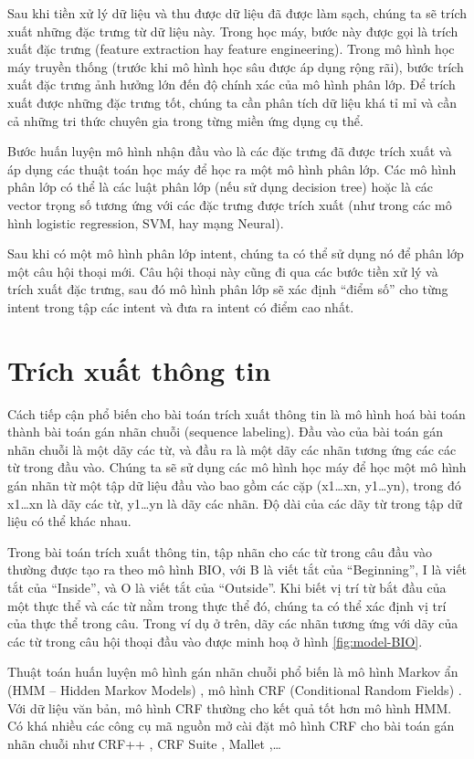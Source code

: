 Sau khi tiền xử lý dữ liệu và thu được dữ liệu đã được làm sạch, chúng ta sẽ trích xuất những đặc trưng từ dữ liệu này. Trong học máy, bước này được gọi là trích xuất đặc trưng (feature extraction hay feature engineering). Trong mô hình học máy truyền thống (trước khi mô hình học sâu được áp dụng rộng rãi), bước trích xuất đặc trưng ảnh hưởng lớn đến độ chính xác của mô hình phân lớp. Để trích xuất được những đặc trưng tốt, chúng ta cần phân tích dữ liệu khá tỉ mỉ và cần cả những tri thức chuyên gia trong từng miền ứng dụng cụ thể.

Bước huấn luyện mô hình nhận đầu vào là các đặc trưng đã được trích xuất và áp dụng các thuật toán học máy để học ra một mô hình phân lớp. Các mô hình phân lớp có thể là các luật phân lớp (nếu sử dụng decision tree) hoặc là các vector trọng số tương ứng với các đặc trưng được trích xuất (như trong các mô hình logistic regression, SVM, hay mạng Neural).

Sau khi có một mô hình phân lớp intent, chúng ta có thể sử dụng nó để phân lớp một câu hội thoại mới. Câu hội thoại này cũng đi qua các bước tiền xử lý và trích xuất đặc trưng, sau đó mô hình phân lớp sẽ xác định “điểm số” cho từng intent trong tập các intent và đưa ra intent có điểm cao nhất.

\section{Trích xuất thông tin}

Cách tiếp cận phổ biến cho bài toán trích xuất thông tin là mô hình hoá bài toán thành bài toán gán nhãn chuỗi (sequence labeling). Đầu vào của bài toán gán nhãn chuỗi là một dãy các từ, và đầu ra là một dãy các nhãn tương ứng các các từ trong đầu vào. Chúng ta sẽ sử dụng các mô hình học máy để học một mô hình gán nhãn từ một tập dữ liệu đầu vào bao gồm các cặp (x1…xn, y1…yn), trong đó x1…xn là dãy các từ, y1…yn là dãy các nhãn. Độ dài của các dãy từ trong tập dữ liệu có thể khác nhau.

Trong bài toán trích xuất thông tin, tập nhãn cho các từ trong câu đầu vào thường được tạo ra theo  mô hình BIO, với B là viết tắt của “Beginning”, I là viết tắt của “Inside”, và O là viết tắt của “Outside”. Khi biết vị trí từ bắt đầu của một thực thể và các từ nằm trong thực thể đó, chúng ta có thể xác định vị trí của thực thể trong câu. Trong ví dụ ở trên, dãy các nhãn tương ứng với dãy của các từ trong câu hội thoại đầu vào được minh hoạ ở hình \ref{fig:model-BIO}.

Thuật toán huấn luyện mô hình gán nhãn chuỗi phổ biến là mô hình Markov ẩn (HMM – Hidden Markov Models) \cite{2}, mô hình CRF (Conditional Random Fields) \cite{3}. Với dữ liệu văn bản, mô hình CRF thường cho kết quả tốt hơn mô hình HMM. Có khá nhiều các công cụ mã nguồn mở cài đặt mô hình CRF cho bài toán gán nhãn chuỗi như CRF++ \cite{4}, CRF Suite \cite{5}, Mallet \cite{6},…

